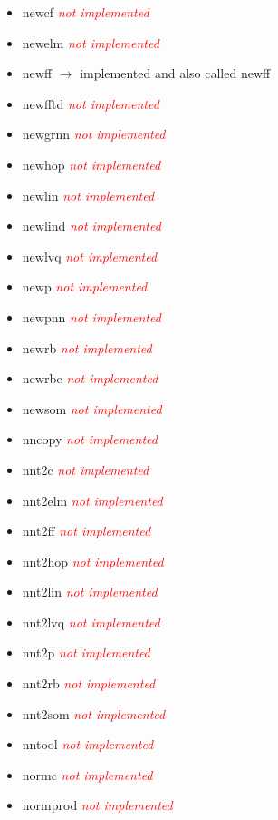 \begin{itemize}
	\item newcf \textcolor{red}{\textit{not implemented}}
	\item newelm \textcolor{red}{\textit{not implemented}}
	\item newff $\rightarrow$ implemented and also called newff
	\item newfftd \textcolor{red}{\textit{not implemented}}
	\item newgrnn \textcolor{red}{\textit{not implemented}}
	\item newhop \textcolor{red}{\textit{not implemented}}
	\item newlin \textcolor{red}{\textit{not implemented}}
	\item newlind \textcolor{red}{\textit{not implemented}}
	\item newlvq \textcolor{red}{\textit{not implemented}}
	\item newp \textcolor{red}{\textit{not implemented}}
	\item newpnn \textcolor{red}{\textit{not implemented}}
	\item newrb \textcolor{red}{\textit{not implemented}}
	\item newrbe \textcolor{red}{\textit{not implemented}}
	\item newsom \textcolor{red}{\textit{not implemented}}
	\item nncopy \textcolor{red}{\textit{not implemented}}
	\item nnt2c \textcolor{red}{\textit{not implemented}}
	\item nnt2elm \textcolor{red}{\textit{not implemented}}
	\item nnt2ff \textcolor{red}{\textit{not implemented}}
	\item nnt2hop \textcolor{red}{\textit{not implemented}}
	\item nnt2lin \textcolor{red}{\textit{not implemented}}
	\item nnt2lvq \textcolor{red}{\textit{not implemented}}
	\item nnt2p \textcolor{red}{\textit{not implemented}} 
	\item nnt2rb \textcolor{red}{\textit{not implemented}}
	\item nnt2som \textcolor{red}{\textit{not implemented}}
	\item nntool \textcolor{red}{\textit{not implemented}}
	\item normc \textcolor{red}{\textit{not implemented}}
	\item normprod \textcolor{red}{\textit{not implemented}}

\end{itemize}
